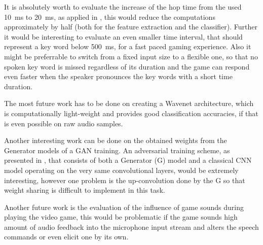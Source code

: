 It is absolutely worth to evaluate the increase of the hop time from the used \SI{10}{\milli\second} to \SI{20}{\milli\second}, as applied in \cite{Peter2020}, this would reduce the computations approximately by half (both for the feature extraction and the classifier).
Further it would be interesting to evaluate an even smaller time interval, that should represent a key word below \SI{500}{\milli\second}, for a fast paced gaming experience.
Also it might be preferrable to switch from a fixed input size to a flexible one, so that no spoken key word is missed regardless of its duration and the game can respond even faster when the speaker pronounces the key words with a short time duration.

The most future work has to be done on creating a Wavenet architecture, which is computationally light-weight and provides good classification accuracies, if that is even possible on raw audio samples.

Another interesting work can be done on the obtained weights from the Generator models of a GAN training. 
An adversarial training scheme, as presented in \cite{Oezdenizci2020}, that consists of both a Generator (G) model and a classical CNN model operating on the very same convolutional layers, would be extremely interesting, however one problem is the up-convolution done by the G so that weight sharing is difficult to implement in this task.

Another future work is the evaluation of the influence of game sounds during playing the video game, this would be problematic if the game sounds high amount of audio feedback into the microphone input stream and alters the speech commands or even elicit one by its own.